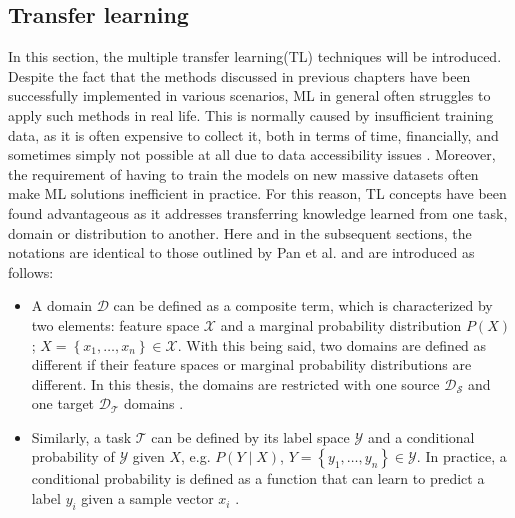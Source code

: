 

\subsection{Transfer learning}
\label{transferLearning} 
In this section, the multiple transfer learning(TL) techniques will be introduced. Despite the fact that the methods discussed in previous chapters have been successfully implemented in various scenarios, ML in general often struggles to apply such methods in real life. This is normally caused by insufficient training data, as it is often expensive to collect it, both in terms of time, financially, and sometimes simply not possible at all due to data accessibility issues \cite{Zhuang2019}. Moreover, the requirement of having to train the models on new massive datasets often make ML solutions inefficient in practice. For this reason, TL concepts have been found advantageous as it addresses transferring knowledge learned from one task, domain or distribution to another. Here and in the subsequent sections, the notations are identical to those outlined by Pan et al. \cite{Pan2010} and are introduced as follows:  


\begin{itemize}
\item A domain $\mathcal{D}$ can be defined as a composite term, which is characterized by two elements: feature space $\mathcal{X}$ and a marginal probability distribution $P(X)$; $X=\left\{x_{1}, \ldots, x_{n}\right\} \in \mathcal{X}$. With this being said, two domains are defined as different if their feature spaces or marginal probability distributions are different. In this thesis, the domains are restricted with one source $\mathcal{D_S}$ and one target $\mathcal{D_T}$ domains \cite{Pan2010}. 
\item Similarly, a task $\mathcal{T}$ can be defined by its label space $\mathcal{Y}$ and a conditional probability of $\mathcal{Y}$ given $X$, e.g. $P(Y \mid X)$, $Y=\left\{y_{1}, \ldots, y_{n}\right\} \in \mathcal{Y}$. In practice, a conditional probability is defined as a function that can learn to predict a label $y_i$ given a sample vector $x_i$ \cite{Pan2010}. 
\end{itemize} 


